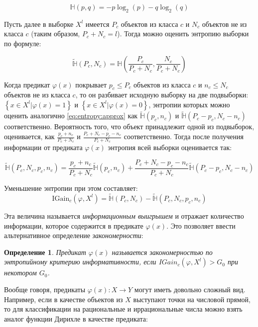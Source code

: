 \documentclass[12pt]{article}
\newtheorem{definition}{Определение}
\begin{document}
\[\mathbb{H}(p, q) = -p\log_2(p)-q\log_2(q)\]

Пусть далее в выборке \(X^l\) имеется \(P_c\) объектов из класса \(c\)
и \(N_c\) объектов не из класса \(c\) (таким образом, \(P_c + N_c =
l\)). Тогда можно оценить энтропию выборки по формуле:

\begin{equation}\label{eq:entropy:approx}
\tilde{\mathbb{H}}(P_c, N_c) =
\mathbb{H}\left(\frac{P_c}{P_c+N_c},\frac{N_c}{P_c+N_c}\right)
\end{equation}

Когда предикат \(\varphi(x)\) покрывает \(p_c\leq P_c\) объектов из
класса \(c\) и \(n_c\leq N_c\) объектов не из класса \(c\), то он
разбивает исходную выборку на две подвыборки: \(\left\{x\in X^l |
\varphi(x) = 1\right\}\) и \(\left\{x\in X^l | \varphi(x) =
0\right\}\), энтропии которых можно оценить аналогично
\ref{eq:entropy:approx} как \(\tilde{\mathbb{H}}(p_c, n_c)\) и
\(\tilde{\mathbb{H}}(P_c - p_c, N_c - n_c)\)
соответственно. Вероятность того, что объект принадлежит одной из
подвыборок, оценивается, как \(\frac{p_c + n_c}{P_c + N_c}\) и
\(\frac{P_c + N_c - p_c - n_c}{P_c + N_c}\) соответственно. Тогда
после получения информации от предиката \(\varphi(x)\) энтропия всей
выборки оценивается так:

\[
\tilde{\mathbb{H}}(P_c, N_c, p_c, n_c) =
\frac{p_c + n_c}{P_c + N_c}\tilde{\mathbb{H}}(p_c, n_c) +
\frac{P_c+N_c-p_c-n_c}{P_c+N_c}\tilde{\mathbb{H}}(P_c - p_c, N_c - n_c)
\]

Уменьшение энтропии при этом составляет:
\[
\text{IGain}_c(\varphi, X^l) =
\tilde{\mathbb{H}}(P_c, N_c) - \tilde{\mathbb{H}}(P_c, N_c, p_c, n_c)
\]

Эта величина называется \emph{информационным выигрышем} и отражает
количество информации, которое содержится в предикате
\(\varphi(x)\). Это позволяет ввести альтернативное определение
\emph{закономерности}:

\begin{definition}
  Предикат \(\varphi(x)\) называется \emph{закономерностью} по
  энтропийному критерию информативности, если \(IGain_c (\varphi, X^l)
  > G_0\) при некотором \(G_0\).
\end{definition}

Вообще говоря, предикаты \(\varphi(x)\colon X \rightarrow Y\) могут
иметь довольно сложный вид. Например, если в качестве объектов из
\(X\) выступают точки на числовой прямой, то для классификации на
рациональные и иррациональные числа можно взять аналог функции Дирихле
в качестве предиката:
\end{document}
